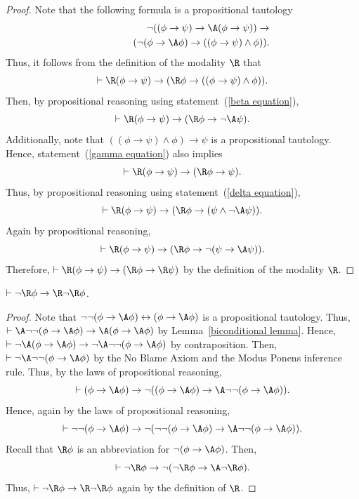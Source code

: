 \documentclass[letterpaper]{article}
\begin{document}
\begin{proof}
Note that the following formula is a propositional tautology
\begin{eqnarray*}
&&\neg((\phi\to\psi)\to\A(\phi\to\psi))\to\\
&&\hspace{10mm}(\neg(\phi\to\A\phi) \to ((\phi\to\psi)\wedge \phi)).
\end{eqnarray*}
Thus, it follows from the definition of the modality $\R$ that
\begin{equation}\label{gamma equation}
\vdash\R(\phi\to\psi)\to(\R\phi \to ((\phi\to\psi)\wedge \phi)).
\end{equation}
Then, by  propositional reasoning using statement~(\ref{beta equation}),
\begin{equation}\label{delta equation}
\vdash \R(\phi\to\psi)\to(\R\phi \to \neg\A\psi).    
\end{equation}
Additionally, note that $((\phi\to\psi)\wedge \phi)\to\psi$ is a propositional tautology. Hence, statement~(\ref{gamma equation}) also implies
$$
\vdash\R(\phi\to\psi)\to(\R\phi \to \psi).
$$
Thus, by propositional reasoning using statement~(\ref{delta equation}),
$$
\vdash \R(\phi\to\psi)\to(\R\phi \to (\psi\wedge \neg\A\psi)).
$$
Again by propositional reasoning,
$$
\vdash \R(\phi\to\psi)\to(\R\phi \to \neg(\psi\to\A\psi)).
$$
Therefore, $\vdash\R(\phi\to\psi)\to(\R\phi\to\R\psi)$ by the definition of the modality $\R$.
\end{proof}



\begin{lemma}\label{negative introspection for R}
$\vdash\neg\R\phi\to\R\neg\R\phi$.
\end{lemma}
\begin{proof}
Note that $\neg\neg(\phi\to\A\phi)\leftrightarrow(\phi\to\A\phi)$ is a propositional tautology. Thus, $\vdash\A\neg\neg(\phi\to\A\phi)\to\A(\phi\to\A\phi)$ by Lemma~\ref{biconditional lemma}. Hence, $\vdash\neg\A(\phi\to\A\phi)\to \neg\A\neg\neg(\phi\to\A\phi)$ by contraposition. Then, $\vdash\neg\A\neg\neg(\phi\to\A\phi)$ by the No Blame Axiom and the Modus Ponens inference rule.
Thus, by the laws of propositional reasoning,
$$
\vdash (\phi\to\A\phi) \to \neg((\phi\to\A\phi) \to \A\neg\neg(\phi\to\A\phi)).
$$
Hence, again by the laws of propositional reasoning,
$$
\vdash \neg\neg(\phi\to\A\phi) \to \neg(\neg\neg(\phi\to\A\phi) \to \A\neg\neg(\phi\to\A\phi)).
$$
Recall that $\R\phi$ is an abbreviation for $\neg(\phi\to\A\phi)$. Then,
$$
\vdash \neg\R\phi \to \neg(\neg\R\phi \to \A\neg\R\phi).
$$
Thus, $\vdash\neg\R\phi\to\R\neg\R\phi$ again by the definition of $\R$.
\end{proof}
\end{document}
